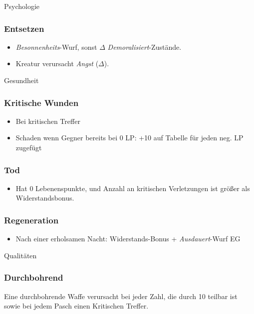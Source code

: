 \documentclass{article}
\begin{document}
\begin{multicols*}{3}
\begin{slsframe}{Psychologie}
        \subsubsection*{Entsetzen}
        \begin{itemize}
            \setlength\itemsep{0.1em}
            \item \textit{Besonnenheits}-Wurf, sonst $\Delta$ \textit{Demoralisiert}-Zustände. 
            \item Kreatur verursacht \textit{Angst} ($\Delta$).
        \end{itemize}

    \end{slsframe}

    \begin{slsframe}{Gesundheit}
        \subsubsection*{Kritische Wunden}
        \begin{itemize}[noitemsep]
            \item Bei kritischen Treffer
            \item Schaden wenn Gegner bereits bei 0 LP: +10 auf Tabelle für jeden neg. LP zugefügt
        \end{itemize}
        \subsubsection*{Tod}
        \begin{itemize}[noitemsep]
        \item Hat 0 Lebenenspunkte, und Anzahl an kritischen Verletzungen ist größer als Widerstandsbonus.
        \end{itemize}
        \subsubsection*{Regeneration}
        \begin{itemize}[noitemsep]
            \item Nach einer erholsamen Nacht: Widerstands-Bonus + \textit{Ausdauert}-Wurf EG
        \end{itemize}
    \end{slsframe}

    \begin{slsframe}{Qualitäten}
        \subsubsection*{Durchbohrend}
        Eine durchbohrende Waffe verursacht bei jeder Zahl, die durch 10 teilbar ist sowie bei jedem Pasch einen Kritischen Treffer.


\end{slsframe}
\end{multicols*}
\end{document}

